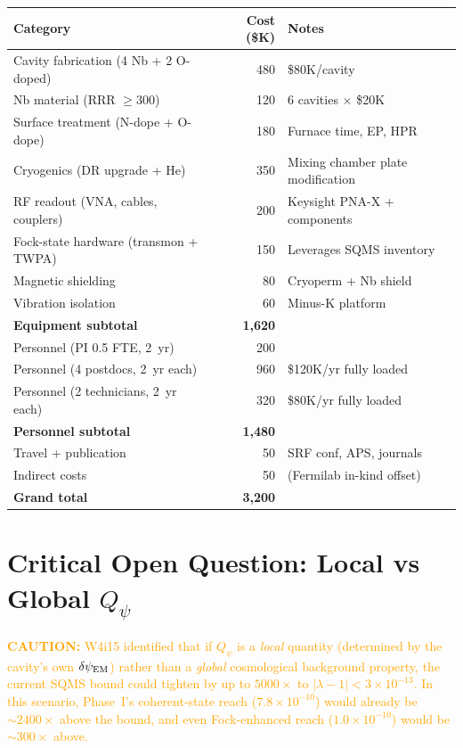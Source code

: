 \documentclass[11pt]{article}
\newcommand{\ee}[1]{\times 10^{#1}}
\newcommand{\lbone}{|\lambda - 1|}
\newcommand{\Qpsi}{Q_\psi}
\newcommand{\caution}[1]{\textcolor{orange}{\textbf{CAUTION:} #1}}
\begin{document}
\begin{center}
\renewcommand{\arraystretch}{1.2}
\begin{tabular}{@{}lrl@{}}
\toprule
\textbf{Category} & \textbf{Cost (\$K)} & \textbf{Notes} \\
\midrule
Cavity fabrication (4 Nb + 2 O-doped) & 480 & \$80K/cavity \\
Nb material (RRR $\geq 300$) & 120 & 6 cavities $\times$ \$20K \\
Surface treatment (N-dope + O-dope) & 180 & Furnace time, EP, HPR \\
Cryogenics (DR upgrade + He) & 350 & Mixing chamber plate modification \\
RF readout (VNA, cables, couplers) & 200 & Keysight PNA-X + components \\
Fock-state hardware (transmon + TWPA) & 150 & Leverages SQMS inventory \\
Magnetic shielding & 80 & Cryoperm + Nb shield \\
Vibration isolation & 60 & Minus-K platform \\
\midrule
\textbf{Equipment subtotal} & \textbf{1,620} & \\
\midrule
Personnel (PI 0.5 FTE, 2~yr) & 200 & \\
Personnel (4 postdocs, 2~yr each) & 960 & \$120K/yr fully loaded \\
Personnel (2 technicians, 2~yr each) & 320 & \$80K/yr fully loaded \\
\midrule
\textbf{Personnel subtotal} & \textbf{1,480} & \\
\midrule
Travel + publication & 50 & SRF conf, APS, journals \\
Indirect costs & 50 & (Fermilab in-kind offset) \\
\midrule
\textbf{Grand total} & \textbf{3,200} & \\
\bottomrule
\end{tabular}
\end{center}


\section{Critical Open Question: Local vs Global $\Qpsi$}

\caution{W4i15 identified that if $\Qpsi$ is a \emph{local} quantity
(determined by the cavity's own $\delta\psi_{\rm EM}$) rather than a
\emph{global} cosmological background property, the current SQMS bound
could tighten by up to $5000\times$ to $\lbone < 3\ee{-13}$. In this
scenario, Phase~I's coherent-state reach ($7.8\ee{-10}$) would already
be $\sim 2400\times$ above the bound, and even Fock-enhanced reach
($1.0\ee{-10}$) would be $\sim 300\times$ above.}
\end{document}
